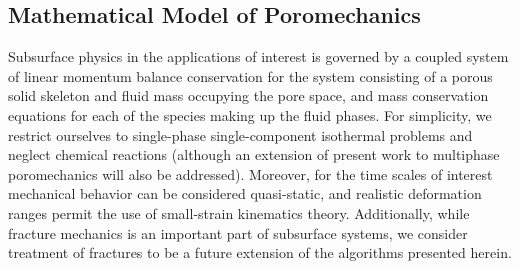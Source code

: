 \subsection{Mathematical Model of Poromechanics}
\label{subsec:intro_problem_model}

Subsurface physics in the applications of interest is governed by a coupled system of linear momentum balance conservation for the system consisting of a porous solid skeleton and fluid mass occupying the pore space, and mass conservation equations for each of the species making up the fluid phases.   For simplicity, we restrict ourselves to single-phase single-component isothermal problems and neglect chemical reactions (although an extension of present work to multiphase poromechanics will also be addressed).   Moreover, for the time scales of interest mechanical behavior can be considered quasi-static, and realistic deformation ranges permit the use of small-strain kinematics theory.   Additionally, while fracture mechanics is an important part of subsurface systems, we consider treatment of fractures to be a future extension of the algorithms presented herein.

